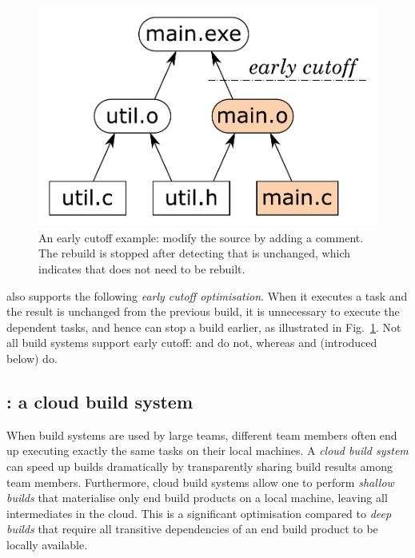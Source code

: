 \begin{figure}[h]
\centerline{\includegraphics[scale=0.28]{fig/make-example-cutoff.pdf}}
\vspace{-2mm}
\caption{An early cutoff example: modify the source  by adding a
comment. The rebuild is stopped after detecting that  is unchanged,
which indicates that  does not need to be rebuilt.\label{fig-cutoff}}
\end{figure}

\Shake also supports the following \emph{early cutoff optimisation}. When it
executes a task and the result is unchanged from the previous build, it is
unnecessary to execute the dependent tasks, and hence \Shake can stop a build
earlier, as illustrated in Fig.~\ref{fig-cutoff}. Not all build systems support
early cutoff: \Make and \Excel do not, whereas \Shake and \Bazel (introduced
below) do.

\subsection{\Bazel: a cloud build system}
\label{sec-background-shake}

When build systems are used by large teams, different team members
often end up executing exactly the same tasks on their local machines.
A \emph{cloud build system} can speed up builds dramatically by
transparently sharing build results among team members. Furthermore, cloud
build systems allow one to perform \emph{shallow builds} that materialise
only end build products on a local machine, leaving all intermediates in the
cloud. This is a significant optimisation compared to \emph{deep builds}
that require all transitive dependencies of an end build product to be
locally available. %

